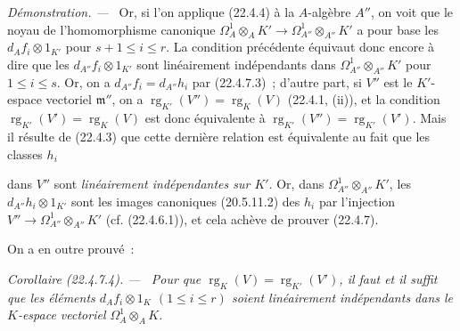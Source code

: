 \documentclass[10pt,oneside]{book}
\makeatletter
\newcommand{\setmanualcurrentlabel}[1]{\def\@currentlabel{#1}}
\newcommand{\oldpage}[2][]{%
  \setcounter{footnote}{0}%
  \marginpar{\scriptsize\textbf{#1}~|~#2}\ignorespaces}
\newenvironment{corollary}[1][]{%
  \setmanualcurrentlabel{#1}\par\medskip\noindent\itshape Corollaire (#1). ---\ }{\par}
\newenvironment{proof}{%
  \par\medskip\noindent\textit{Démonstration. ---\ }}{\par}
\makeatother
\begin{document}
\begin{proof}
Or, si l'on applique (22.4.4) à la $A$-algèbre $A''$, on voit que le noyau de
l'homomorphisme canonique
$\Omega^1_A\otimes_AK'\longrightarrow\Omega^1_{A''}\otimes_{A''}K'$ a pour
base les $d_Af_i\otimes1_{K'}$ pour $s+1\leqslant i\leqslant r$. La condition
précédente équivaut donc encore à dire que les $d_{A''}f_i\otimes1_{K'}$ sont
linéairement indépendants dans $\Omega^1_{A''}\otimes_{A''}K'$ pour
$1\leqslant i\leqslant s$. Or, on a $d_{A''}f_i=d_{A''}h_i$ par (22.4.7.3)~;
d'autre part, si $V''$ est le $K'$-espace vectoriel $\mathfrak m''$, on a
$\operatorname{rg}_{K'}(V'')=\operatorname{rg}_K(V)$ (22.4.1, (ii)), et la condition
$\operatorname{rg}_{K'}(V')=\operatorname{rg}_K(V)$ est donc équivalente à
$\operatorname{rg}_{K'}(V'')=\operatorname{rg}_{K'}(V')$. Mais il résulte de (22.4.3) que cette dernière
relation est équivalente au fait que les classes $h_i$

\oldpage[0\textsubscript{IV-1}]{200}

dans $V''$ sont \emph{linéairement indépendantes sur $K'$}. Or, dans
$\Omega^1_{A''}\otimes_{A''}K'$, les $d_{A''}h_i\otimes1_{K'}$ sont les images
canoniques (20.5.11.2) des $h_i$ par l'injection
$V''\longrightarrow\Omega^1_{A''}\otimes_{A''}K'$ (cf. (22.4.6.1)), et cela
achève de prouver (22.4.7).
\end{proof}

On a en outre prouvé~:

\begin{corollary}[22.4.7.4]
\label{0.22.4.7.4-fr}
Pour que $\operatorname{rg}_K(V)=\operatorname{rg}_{K'}(V')$, il faut et il suffit que les éléments
$d_Af_i\otimes1_K$ $(1\leqslant i\leqslant r)$ soient linéairement
indépendants dans le $K$-espace vectoriel $\Omega^1_A\otimes_AK$.
\end{corollary}
\end{document}
